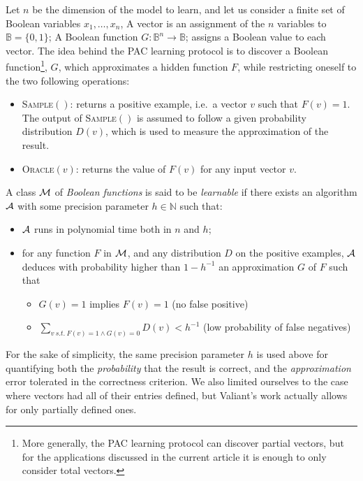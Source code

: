 \documentclass{llncs}
\begin{document}
Let $n$ be the dimension of the model to learn, and let us consider a finite set of Boolean variables $x_1,\ldots,x_n$,
 A vector is an assignment of the $n$ variables to  $\mathbb{B} = \{0,1\}$;
 A Boolean function $G:{\mathbb{B}}^n \rightarrow \mathbb{B}$;
	assigns a Boolean value to each vector.
The idea behind the PAC learning protocol is to discover a Boolean
function\footnote{More generally, the PAC learning protocol can discover
partial vectors, but for the applications discussed in the
current article it is enough to only consider total vectors.}, $G$, which approximates a hidden function $F$, while restricting oneself to the two following operations:
\begin{itemize}
  \item
\textsc{Sample}$()$: returns a positive example, i.e.~a vector $v$ such that $F(v)=1$.
The output of \textsc{Sample}$()$ is assumed to follow a given probability distribution $D(v)$, which is used to measure the approximation of the result.
  \item
\textsc{Oracle}$(v)$: returns the value of $F(v)$ for any input vector $v$.
\end{itemize}


\begin{definition}\label{def:learnclass}
   A class $\cal M$ of \emph{Boolean functions} is said to be \emph{learnable}
   if there exists an algorithm $\cal A$ with some precision parameter $h\in\mathbb N$ such that:
   \begin{itemize}
      \item $\cal A$ runs in polynomial time both in $n$ and $h$;
      \item
         for any function $F$ in $\cal M$, and any distribution $D$ on the positive examples,
         $\cal A$ deduces with probability higher than $1-h^{-1}$ an approximation $G$ of $F$ such that
         \begin{itemize}
            \item $G(v)=1$ implies $F(v)=1$ (no false positive)
            \item
               $\displaystyle\sum_{v\ s.t.\ F(v)=1\wedge G(v)=0} D(v) < h^{-1}$ (low probability of false negatives)
         \end{itemize}
   \end{itemize}
\end{definition}

For the sake of simplicity, the same precision parameter $h$ is used above for quantifying both the \emph{probability} that the result is correct,
and the \emph{approximation} error tolerated in the correctness criterion.
We also limited ourselves to the case where vectors had all of their entries defined, but Valiant's work actually allows for only partially defined ones.
\end{document}
